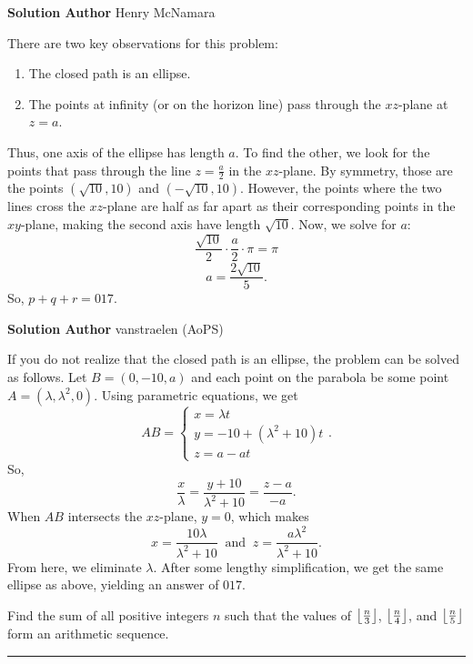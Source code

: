 \documentclass[11pt]{scrartcl}
\newcommand*{\problemfont}{\sffamily\bfseries}
\begin{document}
{\problemfont Solution Author} Henry McNamara

There are two key observations for this problem:
\begin{enumerate}
    \item The closed path is an ellipse.
    \item The points at infinity (or on the horizon line) pass through the $xz$-plane at $z = a$.
\end{enumerate}
Thus, one axis of the ellipse has length $a$. To find the other, we look for the points that pass through the line $z = \frac{a}{2}$ in the $xz$-plane. By symmetry, those are the points $(\sqrt{10},10)$ and $(-\sqrt{10},10)$. However, the points where the two lines cross the $xz$-plane are half as far apart as their corresponding points in the $xy$-plane, making the second axis have length $\sqrt{10}$. Now, we solve for $a$:
\[\frac{\sqrt{10}}{2} \cdot \frac{a}{2} \cdot \pi = \pi\]
\[a = \frac{2\sqrt{10}}{5}.\]
So, $p + q + r = \boxed{017}$.

\pagebreak

{\problemfont Solution Author} vanstraelen (AoPS)

If you do not realize that the closed path is an ellipse, the problem can be solved as follows. Let $B = (0, -10, a)$ and each point on the parabola be some point $A = (\lambda, \lambda^{2}, 0)$. Using parametric equations, we get
\[AB = \begin{cases}
    x = \lambda t \\
    y = -10 + (\lambda^{2} + 10)t \\
    z = a - at
\end{cases}.\]
So,
\[\frac{x}{\lambda} = \frac{y + 10}{\lambda^{2} + 10} = \frac{z - a}{-a}.\]
When $AB$ intersects the $xz$-plane, $y = 0$, which makes
\[x = \frac{10\lambda}{\lambda^{2} + 10} \;\; \text{and} \;\; z = \frac{a\lambda^{2}}{\lambda^{2} + 10}.\]
From here, we eliminate $\lambda$. After some lengthy simplification, we get the same ellipse as above, yielding an answer of $\boxed{017}$.

\pagebreak

\begin{problem}
    Find the sum of all positive integers $n$ such that the values of $\left\lfloor \frac{n}{3} \right\rfloor$, $\left\lfloor \frac{n}{4} \right\rfloor$, and $\left\lfloor \frac{n}{5} \right\rfloor$ form an arithmetic sequence.
\end{problem}

\vspace{-\baselineskip}\rule{\textwidth}{0.4pt}
\end{document}
